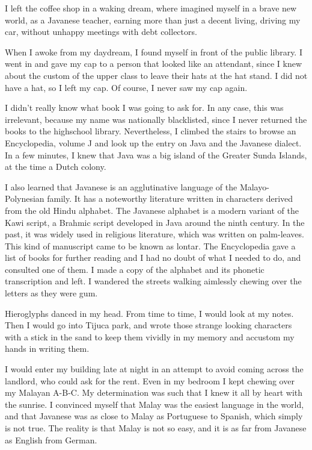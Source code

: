 \documentclass[a4paper,12pt]{book}
\begin{document}
I left the coffee shop in a waking dream,
where imagined myself in a brave new world,
as a Javanese teacher,
earning more than just a decent living,
driving my car,
without unhappy meetings with debt collectors.

When I awoke from my daydream,
I found myself in front of the public library.
I went in and gave my cap to a
person that looked like an attendant,
since I knew about the custom of the
upper class to leave their hats at
the hat stand. I did not have
a hat, so I left my cap. Of course,
I never saw my cap again.

I didn't really know what
book I was going to ask for.
In any case, this was irrelevant,
because my name was nationally blacklisted,
since I never returned the books to
the highschool library. Nevertheless,
I climbed the stairs to browse
an Encyclopedia,
volume J and look up the entry on
Java and the Javanese dialect. 
In a few minutes, I knew that Java was a
big island of the Greater Sunda Islands,
at the time a Dutch colony.

I also learned that Javanese is an agglutinative
language of the Malayo-Polynesian family.
It has a noteworthy literature written in
characters derived from the old Hindu alphabet.
The Javanese alphabet is a modern variant
of the Kawi script, a Brahmic script developed
in Java around the ninth century.
In the past, it was widely used in religious literature,
which was written on palm-leaves.
This kind of manuscript came to be known
as  lontar.
The Encyclopedia gave a list of books for further
reading and I had no doubt of what I needed
to do, and consulted one of them.
I made a copy of the alphabet and its phonetic
transcription and left. I wandered the streets
walking aimlessly chewing over the letters as
they were gum.

Hieroglyphs danced in my head. From time to time,
I would look at my notes. Then I would
go into Tijuca park, and wrote
those strange looking characters
with a stick in the sand to keep
them vividly in my memory
and accustom my hands in writing them.

I would enter my building late at night in
an attempt to avoid coming across the
landlord, who could ask for the rent.
Even in my bedroom I kept chewing over
my Malayan A-B-C. My determination was such
that I knew it all by heart with the sunrise.
I convinced myself that Malay was the
easiest language in the world, and that Javanese
was as close to Malay as Portuguese to
Spanish, which simply is not true.
The reality is that Malay is not so
easy, and it is  as
far from Javanese as English from German.
\end{document}
